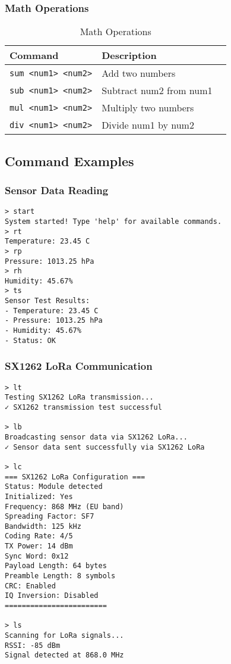\documentclass[11pt,a4paper]{article}
\begin{document}
\subsubsection{Math Operations}
\begin{table}[h]
\centering
\begin{tabular}{|l|l|l|}
\hline
\textbf{Command} & \textbf{Description} \\
\hline
\texttt{sum <num1> <num2>} & Add two numbers \\
\hline
\texttt{sub <num1> <num2>} & Subtract num2 from num1 \\
\hline
\texttt{mul <num1> <num2>} & Multiply two numbers \\
\hline
\texttt{div <num1> <num2>} & Divide num1 by num2 \\
\hline
\end{tabular}
\caption{Math Operations}
\end{table}

\subsection{Command Examples}

\subsubsection{Sensor Data Reading}
\begin{lstlisting}[caption=Reading Sensor Data]
> start
System started! Type 'help' for available commands.
> rt
Temperature: 23.45 C
> rp
Pressure: 1013.25 hPa
> rh
Humidity: 45.67%
> ts
Sensor Test Results:
- Temperature: 23.45 C
- Pressure: 1013.25 hPa
- Humidity: 45.67%
- Status: OK
\end{lstlisting}

\subsubsection{SX1262 LoRa Communication}
\begin{lstlisting}[caption=SX1262 LoRa Communication]
> lt
Testing SX1262 LoRa transmission...
✓ SX1262 transmission test successful

> lb
Broadcasting sensor data via SX1262 LoRa...
✓ Sensor data sent successfully via SX1262 LoRa

> lc
=== SX1262 LoRa Configuration ===
Status: Module detected
Initialized: Yes
Frequency: 868 MHz (EU band)
Spreading Factor: SF7
Bandwidth: 125 kHz
Coding Rate: 4/5
TX Power: 14 dBm
Sync Word: 0x12
Payload Length: 64 bytes
Preamble Length: 8 symbols
CRC: Enabled
IQ Inversion: Disabled
========================

> ls
Scanning for LoRa signals...
RSSI: -85 dBm
Signal detected at 868.0 MHz
\end{lstlisting}
\end{document}
